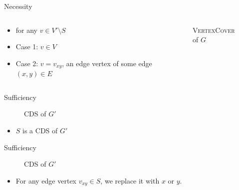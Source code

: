 \documentclass{beamer}
\begin{document}
\begin{frame}{Necessity}
\begin{columns}
    \begin{column}{0.5\textwidth}
        \begin{itemize}[<+->]
            \item for any $v \in V' \setminus S$
            \item Case 1: $v\in V$
            \item Case 2: $v = v_{xy}$, an edge vertex of some edge $(x,y)\in E$
        \end{itemize}
    \end{column}
    \begin{column}{0.5\textwidth}
        \begin{figure}
            \caption{\textsc{VertexCover} of $G$}
        \end{figure}
    \end{column}
\end{columns}
\end{frame}

\begin{frame}{Sufficiency}
\begin{figure}
      \caption{\textsc{CDS} of $G'$}
    \end{figure}
    \begin{itemize}
        \item $S$ is a \textsc{CDS} of $G'$
    \end{itemize}
\end{frame}

\begin{frame}{Sufficiency}
\begin{figure}
      \caption{\textsc{CDS} of $G'$}
\end{figure}
    \begin{itemize}
        \item For any edge vertex $v_{xy}\in S$, we replace it with $x$ or $y$.
    \end{itemize}
\end{frame}
\end{document}
